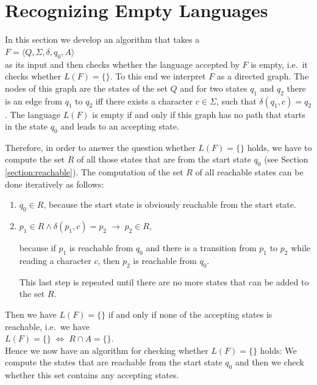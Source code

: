 \section{Recognizing Empty Languages \label{section:leer}}
In this section we develop an algorithm that takes a  
\\[0.2cm]
\hspace*{1.3cm}
$F = \langle Q, \Sigma, \delta, q_0, A \rangle$
\\[0.2cm]
as its input and then checks whether the language accepted by $F$ is empty, i.e.~it checks whether 
$L(F) = \{\}$.  To this end we interpret $F$ as a directed graph.  The nodes of this graph are the
states of the set $Q$ and for two states $q_1$ and
$q_2$ there is an edge from $q_1$ to $q_2$ iff there exists a character $c \in \Sigma$, such that $\delta(q_1,
c) = q_2$.  
The language $L(F)$ is empty if and only if this graph has no path that starts in the state
$q_0$ and leads to an accepting state.

Therefore, in order to answer the question whether $L(F) = \{\}$ holds, we have to compute the set $R$
of all those states that are  from the start state $q_0$ (see Section \ref{section:reachable}).
The computation of the set $R$ of
all reachable states can be done iteratively as follows:
\begin{enumerate}
\item $q_0 \in R$, \quad because the start state is obviously reachable from the start state.
\item $p_1 \in R \wedge \delta(p_1,c) = p_2 \;\rightarrow\; p_2 \in R$,

      because if $p_1$ is reachable from $q_0$ and there is a transition from $p_1$ to $p_2$ while reading a
      character $c$, then $p_2$ is reachable from $q_0$.

      This last step is repeated until there are no more states that can be added to the set $R$.
\end{enumerate}
Then we have $L(F) = \{\}$ if and only if none of the accepting states is reachable, i.e.~we have
\\[0.2cm]
\hspace*{1.3cm}
$L(F) = \{\} \;\Leftrightarrow\; R \cap A = \{\}$.
\\[0.2cm]
Hence we now have an algorithm for checking whether $L(F) = \{\}$ holds:
We compute the states that are reachable from the start state $q_0$ and then we check whether this set
contains any accepting states.

